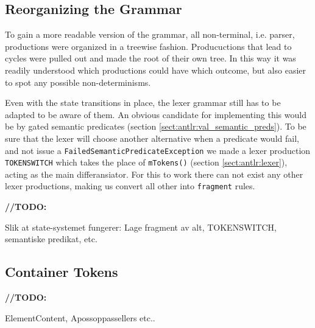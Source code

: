 \subsection{Reorganizing the Grammar}
\label{sect:rewriteGrammar:reorganizing}

To gain a more readable version of the grammar, all non-terminal, i.e. parser, productions were organized in a treewise fashion. Producuctions that lead to cycles were pulled out and made the root of their own tree. In this way it was readily understood which productions could have which outcome, but also easier to spot any possible non-determinisms.

Even with the state transitions in place, the lexer grammar still has to be adapted to be aware of them. An obvious candidate for implementing this would be by gated semantic predicates (section \ref{sect:antlr:val_semantic_preds}). To be sure that the lexer will choose another alternative when a predicate would fail, and not issue a \verb!FailedSemanticPredicateException! we made a lexer production \verb!TOKENSWITCH! which takes the place of \verb!mTokens()! (section \ref{sect:antlr:lexer}), acting as the main differansiator. For this to work there can not exist any other lexer productions, making us convert all other into \verb!fragment! rules.

\textbf{\LARGE //TODO:} 

Slik at state-systemet fungerer: Lage fragment av alt, TOKENSWITCH, semantiske predikat, etc.

\subsection{Container Tokens}
\label{sect:rewriteGrammar:containerTokens}

\textbf{\LARGE //TODO:} 

ElementContent, Apossoppassellers etc..

